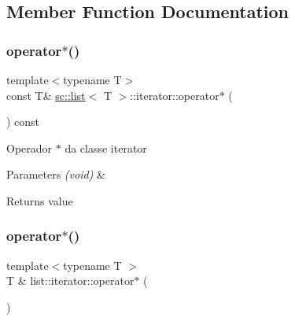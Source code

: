 \subsection{Member Function Documentation}
\mbox{\label{classsc_1_1list_1_1iterator_a8e1feb979567a3fa27add54563d0008f}} 
\subsubsection{\texorpdfstring{operator$\ast$()}{operator*()}\hspace{0.1cm}{\footnotesize\ttfamily [1/2]}}
{\footnotesize\ttfamily template$<$typename T$>$ \\
const T\& \mbox{\hyperlink{classsc_1_1list}{sc\+::list}}$<$ T $>$\+::iterator\+::operator$\ast$ (\begin{DoxyParamCaption}{ }\end{DoxyParamCaption}) const}

Operador $\ast$ da classe iterator 
\begin{DoxyParams}{Parameters}
{\em (void)} & \\
\hline
\end{DoxyParams}
\begin{DoxyReturn}{Returns}
value 
\end{DoxyReturn}
\mbox{\label{classsc_1_1list_1_1iterator_a302efc11d84340a0f69090c001c19b79}} 
\subsubsection{\texorpdfstring{operator$\ast$()}{operator*()}\hspace{0.1cm}{\footnotesize\ttfamily [2/2]}}
{\footnotesize\ttfamily template$<$typename T $>$ \\
T \& list\+::iterator\+::operator$\ast$ (\begin{DoxyParamCaption}{ }\end{DoxyParamCaption})}

\mbox{\label{classsc_1_1list_1_1iterator_a1853e5deff88ddd275f51b366971de17}} 
